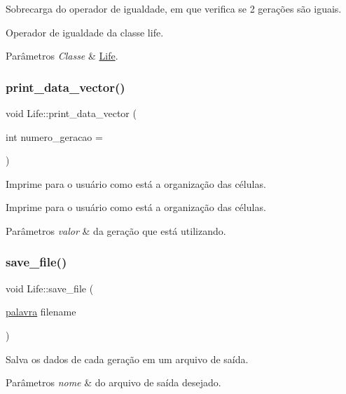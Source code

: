 Sobrecarga do operador de igualdade, em que verifica se 2 gerações são iguais. 

Operador de igualdade da classe life. 
\begin{DoxyParams}{Parâmetros}
{\em Classe} & \hyperlink{classLife}{Life}. \\
\hline
\end{DoxyParams}
\mbox{\label{classLife_ae6230a18db54107b46db859424ccd4c3}} 
\subsubsection{\texorpdfstring{print\+\_\+data\+\_\+vector()}{print\_data\_vector()}}
{\footnotesize\ttfamily void Life\+::print\+\_\+data\+\_\+vector (\begin{DoxyParamCaption}\item[{int}]{numero\+\_\+geracao = {} }\end{DoxyParamCaption})}



Imprime para o usuário como está a organização das células. 

Imprime para o usuário como está a organização das células. 
\begin{DoxyParams}{Parâmetros}
{\em valor} & da geração que está utilizando. \\
\hline
\end{DoxyParams}
\mbox{\label{classLife_a11daef20ad2196b79e3f944f701d8438}} 
\subsubsection{\texorpdfstring{save\+\_\+file()}{save\_file()}}
{\footnotesize\ttfamily void Life\+::save\+\_\+file (\begin{DoxyParamCaption}\item[{\hyperlink{main_8cpp_a7245fe4f29fbfabfc60878ac7b3ccc0c}{palavra}}]{filename }\end{DoxyParamCaption})}

Salva os dados de cada geração em um arquivo de saída. 
\begin{DoxyParams}{Parâmetros}
{\em nome} & do arquivo de saída desejado. \\
\hline
\end{DoxyParams}
\mbox{\label{classLife_ad24dcdaa235aca6216718cd69e346730}} 
